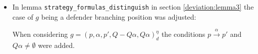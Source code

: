 \begin{itemize}
    \item In lemma \texttt{strategy\_formulas\_distinguish} in section \ref{deviation:lemma3} the case of $g$ being a defender branching position was adjusted: 
    
    When considering $g=(p,\alpha ,p', Q- Q \alpha, Q \alpha)_d^\eta$ the conditions $p \overset{\alpha}{\longrightarrow} p'$ and $Q \alpha \neq \emptyset$ were added. 
\end{itemize}
